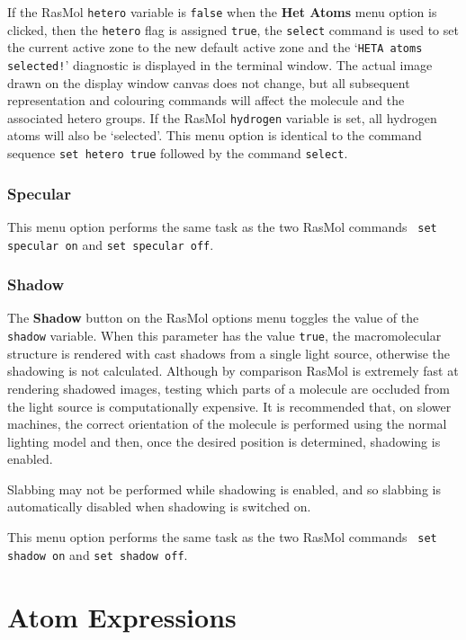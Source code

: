 If the RasMol {\tt hetero} variable is {\tt false} when the {\bf Het Atoms}
menu option is clicked, then the {\tt hetero} flag is assigned {\tt true},
the {\tt select} command is used to set the current active zone to the new
default active zone and the `{\tt HETA atoms selected!}' diagnostic is 
displayed in the terminal window. The actual image drawn on the display 
window canvas does not change, but all subsequent representation and 
colouring commands will affect the molecule and the associated hetero
groups. If the RasMol {\tt hydrogen} variable is set, all hydrogen atoms 
will also be `selected'. This menu option is identical to the command 
sequence {\tt set~hetero~true} followed by the command {\tt select}.

\subsubsection{Specular}
\label{OSpecular}
This menu option performs the same task as the two RasMol commands {\tt
set specular on} and {\tt set specular off}.

\subsubsection{Shadow}
\label{OShadow}
The {\bf Shadow} button on the RasMol options menu toggles the value of 
the {\tt shadow} variable. When this parameter has the value {\tt true},
the macromolecular structure is rendered with cast shadows from a single
light source, otherwise the shadowing is not calculated. Although by
comparison RasMol is extremely fast at rendering shadowed images, testing
which parts of a molecule are occluded from the light source is
computationally expensive. It is recommended that, on slower machines, 
the correct orientation of the molecule is performed using the normal 
lighting model and then, once the desired position is determined, shadowing 
is enabled.

Slabbing may not be performed while shadowing is enabled, and so slabbing
is automatically disabled when shadowing is switched on.

This menu option performs the same task as the two RasMol commands {\tt
set shadow on} and {\tt set shadow off}.



\section{Atom Expressions}
\label{Expressions}

